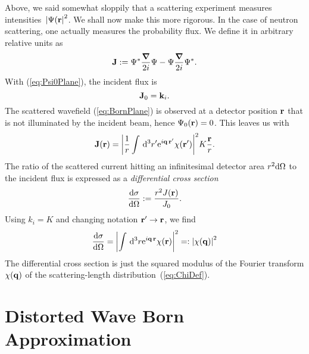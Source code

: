 Above, we said somewhat sloppily
that a scattering experiment measures intensities~${|\Psi(\mathbf{r}|}^2$.
We shall now make this more rigorous.
In the case of neutron scattering,
one actually measures the probability flux.
We define it in arbitrary relative units as
\begin{equation}
  \mathbf{J} := \Psi^*\frac{\bm{\nabla}}{2i}\Psi - \Psi\frac{\bm{\nabla}}{2i}\Psi^*.
\end{equation}
With (\ref{eq:Psi0Plane}), the incident flux is
\begin{equation}
  \mathbf{J}_0 = \mathbf{k}_i.
\end{equation}
The scattered wavefield (\ref{eq:BornPlane}) is observed
at a detector position $\mathbf{r}$ that is not illuminated by the
incident beam, hence $\Psi_0(\mathbf{r})=0$.
This leaves us with
\begin{equation}
  \mathbf{J}(\mathbf{r})
  = {\left|\frac{1}{r}
    \int\,{\rm d}^3r' {\rm e}^{i\mathbf{q}\,\mathbf{r'}}\chi(\mathbf{r'})
    \right|}^2 K\frac{\mathbf{r}}{r}.
\end{equation}
The ratio of the scattered current hitting an infinitesimal detector area
$r^2{\rm d}\Omega$ to the incident flux is expressed as a
\textit{differential cross section}
\begin{equation}
  \frac{{\rm d}\sigma}{{\rm d}\Omega}
  := \frac{r^2 J(\mathbf{r})}{J_0}.
\end{equation}
Using $k_i=K$ and changing notation $\mathbf{r'}\to\mathbf{r}$,
we find
\begin{equation}
  \frac{{\rm d}\sigma}{{\rm d}\Omega}
  = {\left|
    \int\,{\rm d}^3r {\rm e}^{i\mathbf{q}\,\mathbf{r}}\chi(\mathbf{r})
    \right|}^2 =: {\left| \chi(\mathbf{q}) \right|}^2
\end{equation}
The differential cross section is just the squared modulus
of the Fourier transform $\chi(\mathbf{q})$
of the scattering-length distribution~(\ref{eq:ChiDef}).


\section{Distorted Wave Born Approximation} 

